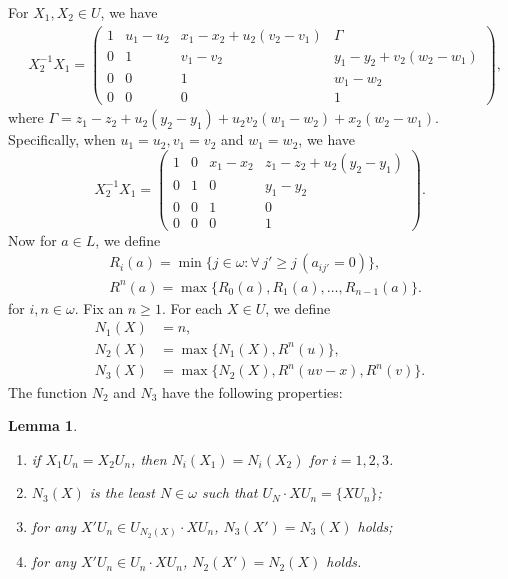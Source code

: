 \documentclass[11pt]{amsart}
\newtheorem{lemma}[theorem]{Lemma}
\theoremstyle{definition}
\theoremstyle{remark}
\numberwithin{equation}{section}
\def\Z {{\mathbb{Z}}}
\def\lh{{\mathrm{lh}}}
\def\itx#1{{\mbox{\textrm{ #1 }}}}
\begin{document}
For $X_1,X_2\in U$, we have
\begin{align}\label{一般情形下的Un陪集}
    &X_2^{-1} X_1 =
    \begin{pmatrix}
    1 & u_1 - u_2 &
    x_1 - x_2 + u_2(v_2 - v_1) &
    \Gamma
    \\
    0 & 1 & v_1 - v_2 &
    y_1 - y_2 + v_2(w_2 - w_1)
    \\
    0 & 0 & 1 & w_1 - w_2
    \\
    0 & 0 & 0 & 1
    \end{pmatrix},
\end{align}
where $\Gamma=z_1-z_2+u_2(y_2-y_1)+u_2v_2(w_1-w_2)+x_2(w_2-w_1)$. Specifically, when $u_1=u_2,v_1=v_2$ and $w_1=w_2$, we have
\begin{equation}\label{特殊情形下的U_n陪集}
    X_2^{-1}X_1=\begin{pmatrix}
    1 & 0 & x_1 - x_2 & z_1 - z_2 + u_2 (y_2 - y_1) \\
    0 & 1 & 0 & y_1 - y_2 \\
    0 & 0 & 1 & 0 \\
    0 & 0 & 0 & 1
    \end{pmatrix}.
\end{equation}
Now for $a\in L$, we define
\begin{align*}
    &R_i(a)=\min\{j\in\omega:\forall\,j'\geq j\,(a_{ij'}=0)\},\\
    &R^n(a)=\max\{R_0(a),R_1(a),\dots,R_{n-1}(a)\}.
\end{align*}
for $i,n\in\omega$. Fix an $n\geq 1$. For each $X\in U$, we define
\begin{align*}
    N_1(X)&=n,\\
    N_2(X)&=\max\{N_1(X),R^n(u)\},\\
    N_3(X)&=\max\{N_2(X),R^n(uv-x),R^n(v)\}.
\end{align*}
The function $N_2$ and $N_3$ have the following properties:
\begin{lemma}\label{N2N3的性质}
    \begin{enumerate}
        \item[(1)] if $X_1U_n=X_2U_n$, then $N_i(X_1)=N_i(X_2)$ for $i=1,2,3$.
        \item[(2)] $N_3(X)$ is the least $N\in\omega$ such that $U_N\cdot XU_n=\{XU_n\}$;
        \item[(3)] for any $X'U_n\in U_{N_2(X)}\cdot XU_n$, $N_3(X')=N_3(X)$ holds;
        \item[(4)] for any $X'U_n\in U_n\cdot XU_n$, $N_2(X')=N_2(X)$ holds.
    \end{enumerate}
\end{lemma}
\end{document}
